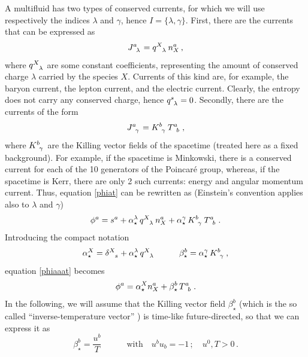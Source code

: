 \documentclass[a4paper, amsfonts, amssymb, amsmath, reprint, showkeys, nofootinbib, twoside, onecolumn,notitlepage]{revtex4-1}
\newcommand{\spc}{\quad \quad \quad}
\theoremstyle{definition}
\theoremstyle{theorem}
\begin{document}
A multifluid has two types of conserved currents, for which we will use respectively the indices $\lambda$ and $\gamma$, hence $I=\{ \lambda, \gamma \}$. First, there are the currents that can be expressed as 
\begin{equation}
J\indices{^a _\lambda} = q\indices{^X _\lambda} \, n_X^a \, ,
\end{equation}
where $q\indices{^X _\lambda}$ are some constant coefficients, representing the amount of conserved charge $\lambda$ carried by the species $X$. Currents of this kind are, for example, the baryon current, the lepton current, and the electric current. Clearly, the entropy does not carry any conserved charge, hence $q\indices{^s _\lambda }=0$. Secondly, there are the currents of the form \cite{Hawking1973}
\begin{equation}
J\indices{^a _\gamma} = K\indices{^b _\gamma} \, T\indices{^a _b} \, ,
\end{equation}
where $K\indices{^b _\gamma}$ are the Killing vector fields of the spacetime (treated here as a fixed background). For example, if the spacetime is Minkowski, there is a conserved current for each of the 10 generators of the Poincar\'e group, whereas, if the spacetime is Kerr, there are only 2 such currents: energy and angular momentum current. Thus, equation \eqref{phiat} can be rewritten as (Einstein's convention applies also to $\lambda$ and $\gamma$)
\begin{equation}\label{phiaaat}
\phi^a = s^a +\alpha^\lambda_\star \, q\indices{^X _\lambda} \, n_X^a + \alpha^\gamma_\star \, K\indices{^b _\gamma} \, T\indices{^a _b} \, .
\end{equation}
Introducing the compact notation
\begin{equation}\label{alphastarxxx}
\alpha^X_\star = \delta\indices{^X _s} + \alpha^\lambda_\star \, q\indices{^X _\lambda} \spc \beta^b_\star = \alpha^\gamma_\star \, K\indices{^b _\gamma} \, ,
\end{equation}
equation \eqref{phiaaat} becomes
\begin{equation}\label{barbossa153}
\phi^a = \alpha^X_\star n_X^a + \beta^b_\star \, T\indices{^a _b} \, .
\end{equation}
In the following, we will assume that the Killing vector field $\beta^b_\star$ (which is the so called ``inverse-temperature vector'' \cite{Becattini2016}) is time-like future-directed, so that we can express it as
\begin{equation}\label{uT}
\beta^b_\star = \dfrac{u^b}{T} \spc \text{with} \quad u^b u_b=-1 \, ; \quad u^0,T>0 \, .
\end{equation} 
\end{document}
